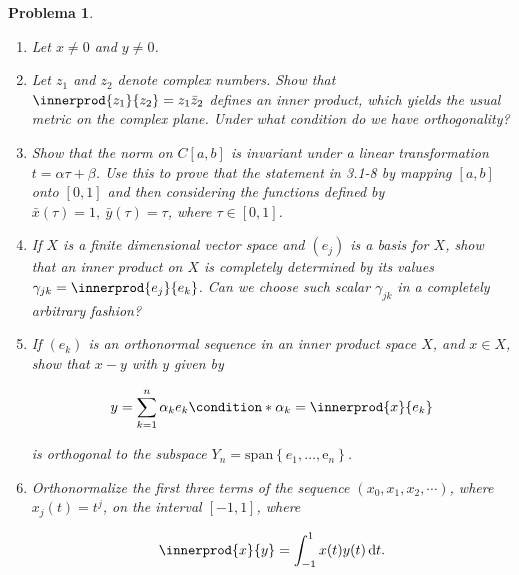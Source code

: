 \documentclass[12pt]{article}
\theoremstyle{break}
\newtheorem{exercise}{Problema}
\theoremstyle{nonumberbreak}
\newcommand*{\e}{\mathrm{e}} %
\begin{document}
    \begin{exercise}
        \begin{enumerate}[label = (\alph*)]
            \item Let \(x \neq 0\) and \(y \neq 0\). 

            \item Let \(z_{1}\) and \(z_{2}\) denote complex numbers. Show that \(\innerprod{z_{1}}{z_{2}} = z_{1}\bar{z}_{2}\) defines an inner product, which yields the usual metric on the complex plane. Under what condition do we have orthogonality?
            
            \item Show that the norm on \(C[a, b]\) is invariant under a linear transformation \(t = \alpha\tau + \beta\). Use this to prove that the statement in 3.1-8 by mapping \([a, b]\) onto \([0, 1]\) and then considering the functions defined by \(\bar{x}(\tau) = 1,\ \bar{y}(\tau) = \tau\), where \(\tau\in[0, 1]\).
            
            \item If \(X\) is a finite dimensional vector space and \((e_{j})\) is a basis for \(X\), show that an inner product on \(X\) is completely determined by its values \(\gamma_{jk} = \innerprod{e_{j}}{e_{k}}\). Can we choose such scalar \(\gamma_{jk}\) in a completely arbitrary fashion?
            
            \item If \((e_{k})\) is an orthonormal sequence in an inner product space \(X\), and \(x \in X\), show that \(x - y\) with \(y\) given by
            
            \begin{equation*}
                y = \sum_{k = 1}^{n} \alpha_{k}e_{k}
                \condition*{\alpha_{k} = \innerprod{x}{e_{k}}}
            \end{equation*}

            is orthogonal to the subspace \(Y_{n} = \textrm{span}\left\lbrace e_{1}, \dots, \e_{n}\right\rbrace\).

            \item Orthonormalize the first three terms of the sequence \((x_{0}, x_{1}, x_{2}, \cdots)\), where \(x_{j}(t) = t^{j}\), on the interval \([-1, 1]\), where
            
            \begin{equation*}
                \innerprod{x}{y} = \int_{-1}^{1} x(t)y(t)\odif{t}.
            \end{equation*}
        \end{enumerate}
    \end{exercise}
\end{document}
